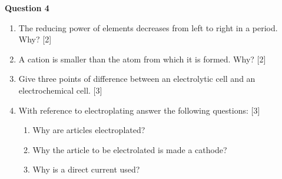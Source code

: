 \noindent
\textbf{Question 4}
\begin{enumerate}[label=(\roman*)]

    \item The reducing power of elements decreases from left to right in 
        a period. Why? \hfill [2]

    \item A cation is smaller than the atom from which it is formed. Why? \hfill [2]

    \item Give three points of difference between an electrolytic cell and 
        an electrochemical cell. \hfill [3]

    \item With reference to electroplating answer the following questions: \hfill [3]
        \begin{enumerate}[label=(\alph*)]
            \item Why are articles electroplated?
            \item Why the article to be electrolated is made a cathode?
            \item Why is a direct current used?
        \end{enumerate}

\end{enumerate}

